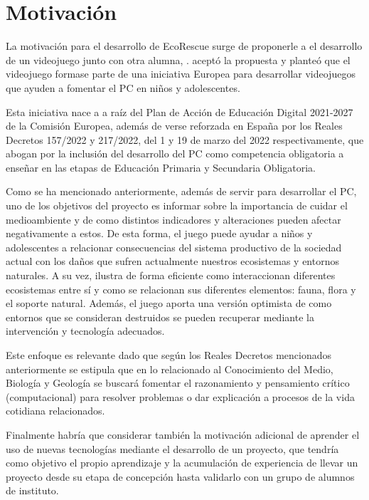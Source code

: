 \section{Motivación}

La motivación para el desarrollo de EcoRescue surge de proponerle a \nombretutor el desarrollo de un videojuego junto con otra alumna, \nombrecoautor. \nombretutor aceptó la propuesta y planteó que el videojuego formase parte de una iniciativa Europea para desarrollar videojuegos que ayuden a fomentar el PC en niños y adolescentes.

Esta iniciativa nace a a raíz del Plan de Acción de Educación Digital 2021-2027 de la Comisión Europea\cite{europaPlan}, además de verse reforzada en España por los Reales Decretos 157/2022\cite{boePrimaria} y 217/2022\cite{boeSecundaria}, del 1 y 19 de marzo del 2022 respectivamente, que abogan por la inclusión del desarrollo del PC como competencia obligatoria a enseñar en las etapas de Educación Primaria y Secundaria Obligatoria.

Como se ha mencionado anteriormente, además de servir para desarrollar el PC, uno de los objetivos del proyecto es informar sobre la importancia de cuidar el medioambiente y de como distintos indicadores y alteraciones pueden afectar negativamente a estos. De esta forma, el juego puede ayudar a niños y adolescentes a relacionar consecuencias del sistema productivo de la sociedad actual con los daños que sufren actualmente nuestros ecosistemas y entornos naturales. A su vez, ilustra de forma eficiente como interaccionan diferentes ecosistemas entre sí y como se relacionan sus diferentes elementos: fauna, flora y el soporte natural. Además, el juego aporta una versión optimista de como entornos que se consideran destruidos se pueden recuperar mediante la intervención y tecnología adecuados. 

Este enfoque es relevante dado que según los Reales Decretos mencionados anteriormente\cite{boePrimaria}\cite{boeSecundaria} se estipula que en lo relacionado al Conocimiento del Medio, Biología y Geología se buscará fomentar el razonamiento y pensamiento crítico (computacional) para resolver problemas o dar explicación a procesos de la vida cotidiana relacionados.

Finalmente habría que considerar también la motivación adicional de aprender el uso de nuevas tecnologías mediante el desarrollo de un proyecto, que tendría como objetivo el propio aprendizaje y la acumulación de experiencia de llevar un proyecto desde su etapa de concepción hasta validarlo con un grupo de alumnos de instituto.